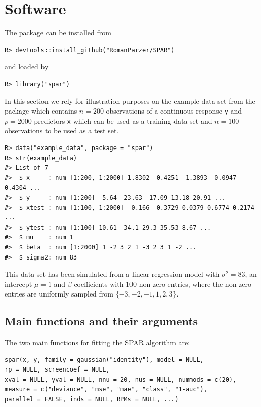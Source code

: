 \documentclass[
  article,
  nojss]{jss}
\begin{document}
\section{Software}\label{sec-software}

The package can be installed from 

\begin{verbatim}
R> devtools::install_github("RomanParzer/SPAR")
\end{verbatim}

and loaded by

\begin{verbatim}
R> library("spar")
\end{verbatim}

In this section we rely for illustration purposes on the example data
set from the package which contains \(n=200\) observations of a
continuous response \texttt{y} and \(p=2000\) predictors \texttt{x}
which can be used as a training data set and \(n=100\) observations to
be used as a test set.

\begin{verbatim}
R> data("example_data", package = "spar")
R> str(example_data)
#> List of 7
#>  $ x     : num [1:200, 1:2000] 1.8302 -0.4251 -1.3893 -0.0947 0.4304 ...
#>  $ y     : num [1:200] -5.64 -23.63 -17.09 13.18 20.91 ...
#>  $ xtest : num [1:100, 1:2000] -0.166 -0.3729 0.0379 0.6774 0.2174 ...
#>  $ ytest : num [1:100] 10.61 -34.1 29.3 35.53 8.67 ...
#>  $ mu    : num 1
#>  $ beta  : num [1:2000] 1 -2 3 2 1 -3 2 3 1 -2 ...
#>  $ sigma2: num 83
\end{verbatim}

This data set has been simulated from a linear regression model with
\(\sigma^2=83\), an intercept \(\mu=1\) and \(\beta\) coefficients with
100 non-zero entries, where the non-zero entries are uniformly sampled
from \(\{-3,-2,-1,1,2,3\}\).

\subsection{Main functions and their
arguments}\label{main-functions-and-their-arguments}

The two main functions for fitting the SPAR algorithm are:

\begin{verbatim}
spar(x, y, family = gaussian("identity"), model = NULL, 
rp = NULL, screencoef = NULL,
xval = NULL, yval = NULL, nnu = 20, nus = NULL, nummods = c(20),
measure = c("deviance", "mse", "mae", "class", "1-auc"),
parallel = FALSE, inds = NULL, RPMs = NULL, ...)
\end{verbatim}
\end{document}
